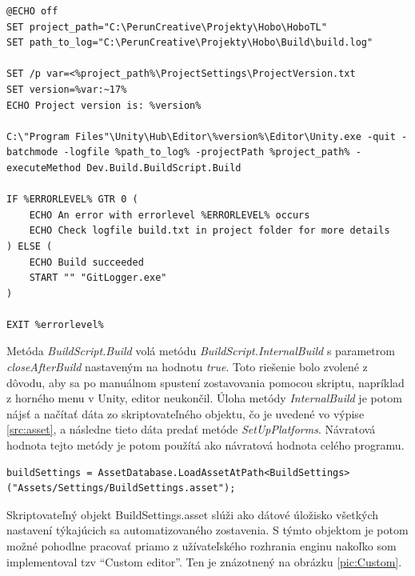\documentclass[slovak, bachelorpractice]{diploma}
\begin{document}
\vspace{5pt}
\begin{lstlisting}[style=Batch,label=src:batch,caption={Skript zabezpečujúci zostavenie hry na serveri}]
@ECHO off
SET project_path="C:\PerunCreative\Projekty\Hobo\HoboTL"
SET path_to_log="C:\PerunCreative\Projekty\Hobo\Build\build.log"

SET /p var=<%project_path%\ProjectSettings\ProjectVersion.txt
SET version=%var:~17%
ECHO Project version is: %version%

C:\"Program Files"\Unity\Hub\Editor\%version%\Editor\Unity.exe -quit -batchmode -logfile %path_to_log% -projectPath %project_path% -executeMethod Dev.Build.BuildScript.Build

IF %ERRORLEVEL% GTR 0 (
	ECHO An error with errorlevel %ERRORLEVEL% occurs
	ECHO Check logfile build.txt in project folder for more details
) ELSE (
	ECHO Build succeeded
	START "" "GitLogger.exe"
)

EXIT %errorlevel%
\end{lstlisting}

Metóda \textit{BuildScript.Build} volá metódu \textit{BuildScript.InternalBuild} s parametrom \textit{closeAfterBuild} nastaveným na hodnotu \textit{true}. Toto riešenie bolo zvolené z dôvodu, aby sa po manuálnom spustení zostavovania pomocou skriptu, napríklad z horného menu v Unity, editor neukončil. Úloha metódy \textit{InternalBuild} je potom nájsť a načítať dáta zo skriptovateľného objektu, čo je uvedené vo výpise \ref{src:asset}, a následne tieto dáta predať metóde \textit{SetUpPlatforms}. Návratová hodnota tejto metódy je potom použítá ako návratová hodnota celého programu.

\vspace{10pt}
\begin{lstlisting}[label=src:asset,caption={Načítanie dát zo skriptovateľného objektu}]
buildSettings = AssetDatabase.LoadAssetAtPath<BuildSettings>("Assets/Settings/BuildSettings.asset");
\end{lstlisting}

Skriptovateľný objekt BuildSettings.asset slúži ako dátové úložisko všetkých nastavení týkajúcich sa automatizovaného zostavenia. S týmto objektom je potom možné pohodlne pracovať priamo z užívateľského rozhrania enginu nakoľko som implementoval tzv \enquote{Custom editor}. Ten je znázotnený na obrázku \ref{pic:Custom}.
\end{document}
